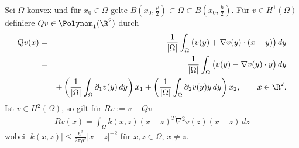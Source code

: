 \begin{Satz}
    \label{satz:3.14}
    Sei $\Omega$ konvex und für $x_0\in \Omega$ gelte $B\left(x_0,
    \frac{\rho}{2}\right)\subset \Omega\subset B\left(x_0, \frac{h}{2}\right)$.
    Für $v\in H^1(\Omega)$ definiere $Qv \in \Polynom_1(\R^2)$ durch
    \begin{eqnarray*}
            Q v(x)
        &=& \frac{1}{|\Omega|} \int_\Omega \big( v(y) + \nabla v(y) \cdot (x-y) \big) \,dy \\
        &=& \frac{1}{|\Omega|} \int_\Omega \big( v(y) - \nabla v(y) \cdot y \big) \,dy \\
            &&+ \left(\frac{1}{|\Omega|} \int_\Omega \partial_1 v(y) \,dy
            \right) x_1 + \left(\frac{1}{|\Omega|} \int_\Omega \partial_2 v(y) y
            \,dy \right) x_2, \qquad x\in \R^2.
    \end{eqnarray*}    
    Ist $v\in H^2(\Omega)$, so gilt für $Rv := v - Qv$
    \begin{eqnarray*}
        R v(x) = \int_\Omega k(x, z) (x-z)^T \nabla^2 v(z) (x-z) \,dz
    \end{eqnarray*}
    wobei $|k(x, z)| \le \frac{h^2}{2 \pi \rho^2} |x-z|^{-2}$ für $x,z \in \Omega$, $x\ne z$.
\end{Satz}


